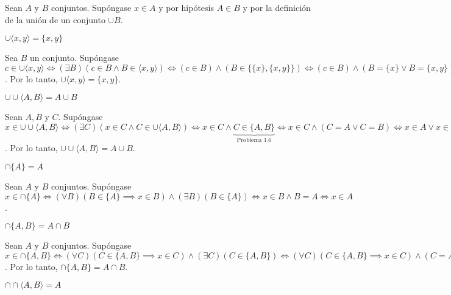 \begin{dem}
	Sean $A$ y $B$ conjuntos. Supóngase $x\in A$ y por hipótesis $A\in B$ y por la definición de la unión de un conjunto $\cup B$. 
\end{dem}
\begin{problema}
	$\cup\langle x, y\rangle=\{x, y\}$
\end{problema}
\begin{dem}
	Sea $B$ un conjunto. Supóngase $c\in \cup \langle x,y\rangle \iff (\exists B)(c\in B\wedge B\in  \langle x,y\rangle)\iff (c\in B)\wedge (B\in \{\{x\},\{x,y\}\})\iff (c\in B)\wedge (B=\{x\}\vee B=\{x,y\})\iff (c\in \{x\})\vee (x\in \{x,y\})$. Por lo tanto, $\cup\langle x, y\rangle=\{x, y\}$. 
\end{dem}
\begin{problema}
	$\cup \cup \langle A, B\rangle=A \cup B$
\end{problema}

\begin{dem}
	Sean $A,B$ y $C$. Supóngase $x\in \cup \cup \langle A,B \rangle \iff (\exists C)(x\in C\wedge C\in \cup \langle A,B\rangle )\iff x\in C\wedge \underbrace{C\in \{A,B\}}_{\text{Problema 1.6}}\iff x\in C \wedge (C=A\vee C=B)\iff x\in A\vee x\in B\iff x\in A\cup B$. Por lo tanto, $\cup \cup \langle A, B\rangle=A \cup B$.
\end{dem}
\begin{problema}
	$\cap\{A\}=A$
\end{problema}

\begin{dem}
	Sean $A$ y $B$ conjuntos. Supóngase $x\in \cap \{A\}\iff (\forall B)(B\in \{A\}\implies x\in B)\wedge (\exists B)(B\in \{A\})\iff x\in B\wedge B=A\iff x\in A$. 
\end{dem}
\begin{problema}
	 $\cap\{A, B\}=A \cap B$
\end{problema}

\begin{dem}
	Sean $A$ y $B$ conjuntos. Supóngase $x\in \cap \{A,B\}\iff (\forall C)(C\in \{A,B\}\implies x\in C)\wedge (\exists C)(C\in \{A,B\})\iff (\forall C)(C\in \{A,B\}\implies x\in C)\wedge (C=A\vee C=B)\iff x\in A \wedge x\in B\iff x\in A\cup B$. Por lo tanto, $\cap\{A, B\}=A \cap B$. 
\end{dem}
\begin{problema}
	 $\cap \cap \langle A, B\rangle=A$
\end{problema}

